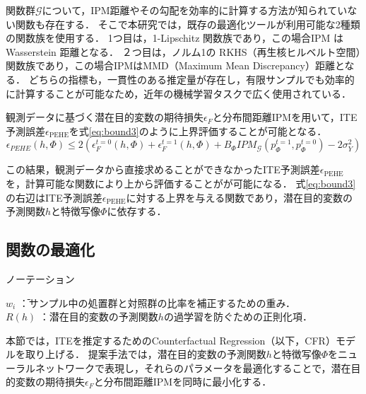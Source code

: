 \documentclass[dvipdfmx]{jreport}
\begin{document}
関数群$\mathcal{G}$について，IPM距離やその勾配を効率的に計算する方法が知られていない関数も存在する．
そこで本研究では，既存の最適化ツールが利用可能な2種類の関数族を使用する．
1つ目は，1-Lipschitz 関数族であり，この場合IPM は Wasserstein 距離となる．
２つ目は，ノルム1の RKHS（再生核ヒルベルト空間）関数族であり，この場合IPMはMMD（Maximum Mean Discrepancy）距離となる．
どちらの指標も，一貫性のある推定量が存在し，有限サンプルでも効率的に計算することが可能なため，近年の機械学習タスクで広く使用されている．

観測データに基づく潜在目的変数の期待損失$\epsilon_F$と分布間距離IPMを用いて，ITE予測誤差$\epsilon_{\text{PEHE}}$を式\eqref{eq:bound3}のように上界評価することが可能となる．
\begin{equation}
    \epsilon_{PEHE}(h, \Phi)
    \leq 2 (\epsilon_F^{t=0}(h, \Phi) + \epsilon_F^{t=1}(h, \Phi) 
    + B_\Phi IPM_{\mathcal{G}}(p_\Phi^{t=1}, p_\Phi^{t=0}) - 2 \sigma_Y^2) \label{eq:bound3} 
\end{equation}

この結果，観測データから直接求めることができなかったITE予測誤差$\epsilon_{\text{PEHE}}$を，計算可能な関数により上から評価することがが可能になる．
式\eqref{eq:bound3}の右辺はITE予測誤差$\epsilon_{\text{PEHE}}$に対する上界を与える関数であり，潜在目的変数の予測関数$h$と特徴写像$\Phi$に依存する．



\subsection{関数の最適化}
\begin{itembox}[l]{\large{ノーテーション}}
    \begin{tabbing}
        \hspace{15pt} \raisebox{0.5ex}{\tiny $\bullet$} $w_i$ \hspace{10pt}\=：サンプル中の処置群と対照群の比率を補正するための重み．\\[0.5em]
        \hspace{15pt} \raisebox{0.5ex}{\tiny $\bullet$} $R(h)$ \>：潜在目的変数の予測関数$h$の過学習を防ぐための正則化項．
    \end{tabbing}
\end{itembox}

本節では，ITEを推定するためのCounterfactual Regression（以下，CFR）モデルを取り上げる．
提案手法では，潜在目的変数の予測関数$h$と特徴写像$\Phi$をニューラルネットワークで表現し，それらのパラメータを最適化することで，潜在目的変数の期待損失$\epsilon_F$と分布間距離IPMを同時に最小化する．
\end{document}
